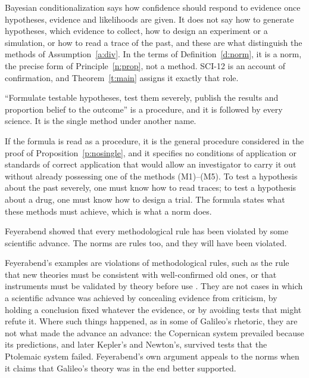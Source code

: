 \documentclass{situationist-preprint}
\begin{document}
\begin{reply}
Bayesian conditionalization says how confidence should respond to evidence once hypotheses, evidence and likelihoods are given. It does not say how to generate hypotheses, which evidence to collect, how to design an experiment or a simulation, or how to read a trace of the past, and these are what distinguish the methods of Assumption~\ref{a:div}. In the terms of Definition~\ref{d:norm}, it is a norm, the precise form of Principle~\ref{n:prop}, not a method. SCI-12 is an account of confirmation, and Theorem~\ref{t:main} assigns it exactly that role.
\end{reply}

\begin{objection}
\enquote{Formulate testable hypotheses, test them severely, publish the results and proportion belief to the outcome} is a procedure, and it is followed by every science. It is the single method under another name.
\end{objection}

\begin{reply}
If the formula is read as a procedure, it is the general procedure considered in the proof of Proposition~\ref{p:nosingle}, and it specifies no conditions of application or standards of correct application that would allow an investigator to carry it out without already possessing one of the methods (M1)--(M5). To test a hypothesis about the past severely, one must know how to read traces; to test a hypothesis about a drug, one must know how to design a trial. The formula states what these methods must achieve, which is what a norm does.
\end{reply}

\begin{objection}
Feyerabend showed that every methodological rule has been violated by some scientific advance. The norms are rules too, and they will have been violated.
\end{objection}

\begin{reply}
Feyerabend's examples are violations of methodological rules, such as the rule that new theories must be consistent with well-confirmed old ones, or that instruments must be validated by theory before use \citep{Feyerabend1975}. They are not cases in which a scientific advance was achieved by concealing evidence from criticism, by holding a conclusion fixed whatever the evidence, or by avoiding tests that might refute it. Where such things happened, as in some of Galileo's rhetoric, they are not what made the advance an advance: the Copernican system prevailed because its predictions, and later Kepler's and Newton's, survived tests that the Ptolemaic system failed. Feyerabend's own argument appeals to the norms when it claims that Galileo's theory was in the end better supported.
\end{reply}
\end{document}
